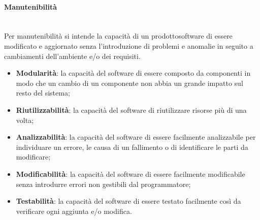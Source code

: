 	\paragraph{Manutenibilità} \mbox{}\\
	Per manutenibilità si intende la capacità di un prodotto\glosp software di essere modificato e aggiornato senza l'introduzione di problemi e anomalie in seguito a cambiamenti dell'ambiente e/o dei requisiti.
	\begin{itemize}
		\item \textbf{Modularità}: la capacità del software di essere composto da componenti in modo che un cambio di un componente non abbia un grande impatto sul resto del sistema;
		\item \textbf{Riutilizzabilità}: la capacità del software di riutilizzare risorse più di una volta;
		\item \textbf{Analizzabilità}: la capacità del software di essere facilmente analizzabile per individuare un errore, le causa di un fallimento o di identificare le parti da modificare;
		\item \textbf{Modificabilità}: la capacità del software di essere facilmente modificabile senza introdurre errori non gestibili dal programmatore;
		\item \textbf{Testabilità}: la capacità del software di essere testato facilmente così da verificare ogni aggiunta e/o modifica.
	\end{itemize}

